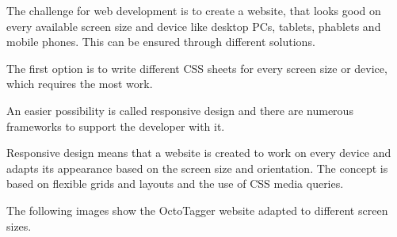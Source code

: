 The challenge for web development is to create a website, that looks good on every available screen size and device like desktop PCs, tablets, phablets and mobile phones. This can be ensured through different solutions.

The first option is to write different CSS sheets for every screen size or device, which requires the most work.

An easier possibility is called responsive design and there are numerous frameworks to support the developer with it. 

Responsive design means that a website is created to work on every device and adapts its appearance based on the screen size and orientation. The concept is based on flexible grids and layouts and the use of CSS media queries.

The following images show the OctoTagger website adapted to different screen sizes.

